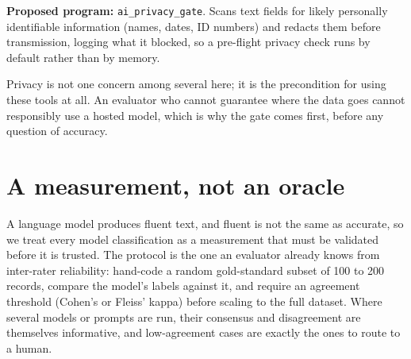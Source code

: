 \documentclass[
    a4paper,
    fontsize=10pt,
    twoside=true,
    numbers=noenddot,
]{kaobook}
\begin{document}
\begin{kaobox}[frametitle=Ado-file Idea: \texttt{ai\_privacy\_gate}]
\textbf{Proposed program:} \texttt{ai\_privacy\_gate}. Scans text fields for likely personally identifiable information (names, dates, ID numbers) and redacts them before transmission, logging what it blocked, so a pre-flight privacy check runs by default rather than by memory.
\end{kaobox}

Privacy is not one concern among several here; it is the precondition for using these tools at all. An evaluator who cannot guarantee where the data goes cannot responsibly use a hosted model, which is why the gate comes first, before any question of accuracy.

\section{A measurement, not an oracle}\label{sec:aiverify}
A language model produces fluent text, and fluent is not the same as accurate, so we treat every model classification as a measurement that must be validated before it is trusted. The protocol is the one an evaluator already knows from inter-rater reliability: hand-code a random gold-standard subset of 100 to 200 records, compare the model's labels against it, and require an agreement threshold (Cohen's or Fleiss' kappa) before scaling to the full dataset. Where several models or prompts are run, their consensus and disagreement are themselves informative, and low-agreement cases are exactly the ones to route to a human.
\end{document}
